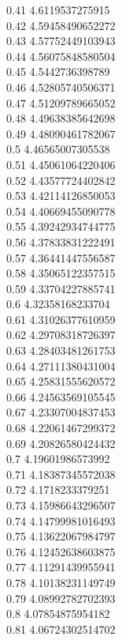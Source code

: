 {0.41	4.6119537275915\\
0.42	4.59458490652272\\
0.43	4.57752449103943\\
0.44	4.56075848580504\\
0.45	4.5442736398789\\
0.46	4.52805740506371\\
0.47	4.51209789665052\\
0.48	4.49638385642698\\
0.49	4.48090461782067\\
0.5	4.46565007305538\\
0.51	4.45061064220406\\
0.52	4.43577724402842\\
0.53	4.42114126850053\\
0.54	4.40669455090778\\
0.55	4.39242934744775\\
0.56	4.37833831222491\\
0.57	4.36441447556587\\
0.58	4.35065122357515\\
0.59	4.33704227885741\\
0.6	4.32358168233704\\
0.61	4.31026377610959\\
0.62	4.29708318726397\\
0.63	4.28403481261753\\
0.64	4.27111380431004\\
0.65	4.25831555620572\\
0.66	4.24563569105545\\
0.67	4.23307004837453\\
0.68	4.22061467299372\\
0.69	4.20826580424432\\
0.7	4.19601986573992\\
0.71	4.18387345572038\\
0.72	4.1718233379251\\
0.73	4.15986643296507\\
0.74	4.14799981016493\\
0.75	4.13622067984797\\
0.76	4.12452638603875\\
0.77	4.11291439955941\\
0.78	4.10138231149749\\
0.79	4.08992782702393\\
0.8	4.07854875954182\\
0.81	4.06724302514702\\
}
